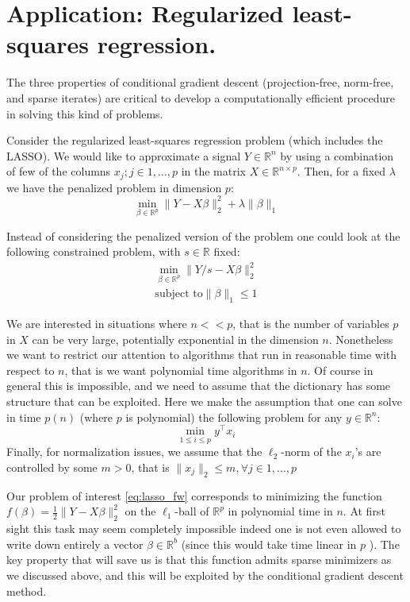 \section{Application: Regularized least-squares regression.}
The three properties of conditional gradient descent (projection-free, norm-free, and sparse iterates) are critical to develop a computationally efficient procedure in solving this kind of problems.

Consider the regularized least-squares regression problem (which includes the LASSO). We would like to approximate a signal $Y \in \mathbb{R}^n$ by using a combination of few of the columns $x_j; j\in 1,\ldots,p$ in the matrix $X \in \mathbb{R}^{n \times p}$. Then, for a fixed $\lambda$ we have the penalized problem in dimension $p$:
\begin{equation}
\min_{\beta \in \mathbb{R}^p} \| Y - X \beta \|_2^2 + \lambda \|\beta\|_1 \nonumber
\end{equation}

Instead of considering the penalized version of the problem one could look at the following constrained problem, with $s \in \mathbb{R}$ fixed:
\begin{align} \label{eq:lasso_fw}
\min_{\beta \in \mathbb{R}^p} \| Y/s - X \beta \|_2^2 \\
\text{subject to} \|\beta\|_1 \leq 1 \nonumber
\end{align}

We are interested in situations where $n<<p$, that is the number of variables $p$ in $X$ can be very large, potentially exponential in the dimension $n$. Nonetheless we want to restrict our attention to algorithms that run in reasonable time with respect to $n$, that is we want polynomial time algorithms in $n$. Of course in general this is impossible, and we need to assume that the dictionary has some structure that can be exploited. Here we make the assumption that one can solve in time $p(n)$ (where $p$ is polynomial) the following problem for any $y\in\mathbb{R}^n$:
\begin{equation}
\min_{ 1\leq i \leq p } y^{\top} x_i\nonumber
\end{equation}
Finally, for normalization issues, we assume that the $\ell_2$-norm of the $x_i$'s are controlled by some $m > 0$, that is $\| x_j \|_2 \leq m, \forall j \in 1,\ldots,p $

Our problem of interest \ref{eq:lasso_fw} corresponds to minimizing the function $f(\beta) = \frac{1}{2}\| Y - X \beta \|_2^2 $ on the $\ell_1$-ball of $\mathbb{R}^p$ in polynomial time in $n$. At first sight this task may seem completely impossible indeed one is not even allowed to write down entirely a vector $\beta \in \mathbb{R}^b$ (since this would take time linear in $p$ ). The key property that will save us is that this function admits sparse minimizers as we discussed above, and this will be exploited by the conditional gradient descent method.


